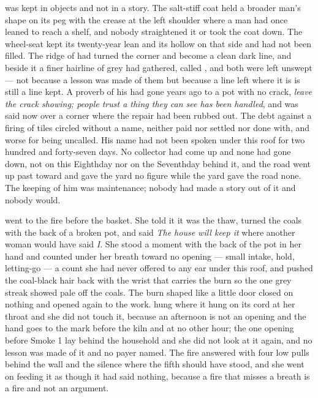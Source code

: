  was kept in objects and not in a story. The salt-stiff coat held a broader man's shape on its peg with the crease at the left shoulder where a man had once leaned to reach a shelf, and nobody straightened it or took the coat down. The wheel-seat kept its twenty-year lean and its hollow on that side and had not been filled. The ridge of  had turned the corner and become a clean dark line, and beside it a finer hairline of grey had gathered, called , and both were left unswept --- not because a lesson was made of them but because a line left where it is is still a line kept. A proverb of his had gone years ago to a pot with no crack, \emph{leave the crack showing; people trust a thing they can see has been handled}, and was said now over a corner where the repair had been rubbed out. The debt against a firing of tiles circled without a name, neither paid nor settled nor done with, and worse for being uncalled. His name had not been spoken under this roof for two hundred and forty-seven days. No collector had come up  and none had gone down, not on this Eighthday nor on the Seventhday behind it, and the road went up past  toward  and gave the yard no figure while the yard gave the road none. The keeping of him was maintenance; nobody had made a story out of it and nobody would.

 went to the fire before the basket. She told it it was the thaw, turned the coals with the back of a broken pot, and said \emph{The house will keep it} where another woman would have said \emph{I}. She stood a moment with the back of the pot in her hand and counted under her breath toward no opening --- small intake, hold, letting-go --- a count she had never offered to any ear under this roof, and pushed the coal-black hair back with the wrist that carries the burn so the one grey streak showed pale off the coals. The burn shaped like a little door closed on nothing and opened again to the work.  hung where it hung on its cord at her throat and she did not touch it, because an afternoon is not an opening and the hand goes to the mark before the kiln and at no other hour; the one opening before Smoke 1 lay behind the household and she did not look at it again, and no lesson was made of it and no payer named. The fire answered with four low pulls behind the wall and the silence where the fifth should have stood, and she went on feeding it as though it had said nothing, because a fire that misses a breath is a fire and not an argument.

